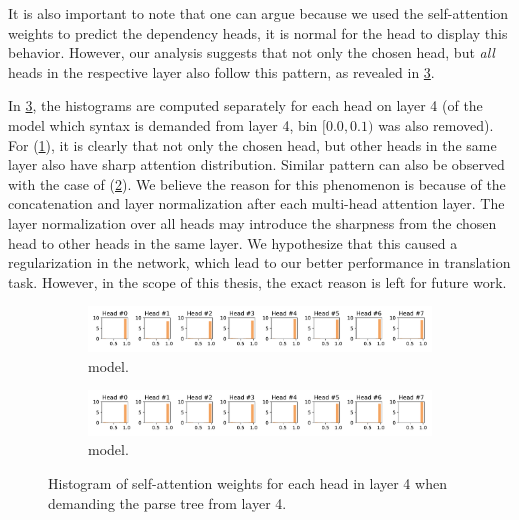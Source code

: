It is also important to note that one can argue because we used the self-attention weights to predict the dependency heads, it is normal for the head to display this behavior.
However, our analysis suggests that not only the chosen head, but \emph{all} heads in the respective layer also follow this pattern, as revealed in \cref{fig:att_dist_4}.

In \cref{fig:att_dist_4}, the histograms are computed separately for each head on layer 4 (of the model which syntax is demanded from layer 4, bin $[0.0,0.1)$ was also removed).
For \DepParse (\cref{fig:att_dist_4_dep}), it is clearly that not only the chosen head, but other heads in the same layer also have sharp attention distribution.
Similar pattern can also be observed with the case of \DiagonalParse (\cref{fig:att_dist_4_mono}).
We believe the reason for this phenomenon is because of the concatenation and layer normalization after each multi-head attention layer.
The layer normalization over all heads may introduce the sharpness from the chosen head to other heads in the same layer.
We hypothesize that this caused a regularization in the network, which lead to our better performance in translation task.
However, in the scope of this thesis, the exact reason is left for future work.

\begin{figure}[t]
    \centering
    \begin{subfigure}[b]{\textwidth}
	    \includegraphics[width=\textwidth]{img/att_dist_4.pdf}
        \caption{\DepParse model.}
        \label{fig:att_dist_4_dep}
    \end{subfigure}
    \begin{subfigure}[b]{\textwidth}
	    \includegraphics[width=\textwidth]{img/mono_att_dist_4.pdf}
        \caption{\DiagonalParse model.}
        \label{fig:att_dist_4_mono}
    \end{subfigure}
    \caption{Histogram of self-attention weights for each head in layer 4 when demanding the parse tree from layer 4.}
    \label{fig:att_dist_4}
\end{figure}

